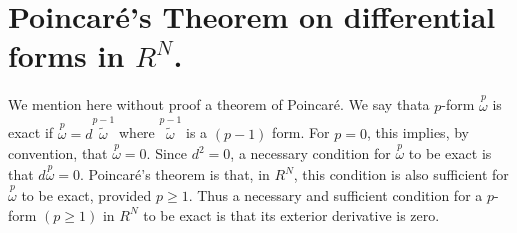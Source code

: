 \section*{Poincar\'e's Theorem on differential forms in $R^{N}$.}

We mention here without proof a theorem of Poincar\'e. We say
that\pageoriginale a $p$-form $\overset{p}{\omega}$ is exact if
$\overset{p}{\omega}=d\overset{p-1}{\widetilde{\omega}}$ where
$\overset{p-1}{\widetilde{\omega}}$ is a $(p-1)$ form. For $p=0$, this
implies, by convention, that $\overset{p}{\omega}=0$. Since $d^{2}=0$,
a necessary condition for $\overset{p}{\omega}$ to be exact is that
$d\overset{p}{\omega}=0$. Poincar\'e's theorem is that, in $R^{N}$,
this condition is also sufficient for $\overset{p}{\omega}$ to be
exact, provided $p\geq 1$. Thus a necessary and sufficient condition
for a $p$-form $(p\geq 1)$ in $R^{N}$ to be exact is that its exterior
derivative is zero.


